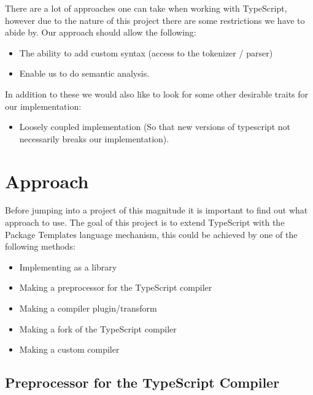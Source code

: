 There are a lot of approaches one can take when working with TypeScript, however due to the nature of this project there are some restrictions we have to abide by.
Our approach should allow the following:

\begin{itemize}
    \item The ability to add custom syntax (access to the tokenizer / parser)
    \item Enable us to do semantic analysis.
\end{itemize}

In addition to these we would also like to look for some other desirable traits for our implementation:

\begin{itemize}
    \item Loosely coupled implementation (So that new versions of typescript not necessarily breaks our implementation).
\end{itemize}


\section{Approach}\label{sec:choosing-the-right-approach}

Before jumping into a project of this magnitude it is important to find out what approach to use. 
The goal of this project is to extend TypeScript with the Package Templates language mechanism, this could be achieved by one of the following methods:

\begin{itemize}
    \item Implementing as a library
    \item Making a preprocessor for the TypeScript compiler
    \item Making a compiler plugin/transform
    \item Making a fork of the TypeScript compiler
    \item Making a custom compiler
\end{itemize}



\subsection{Preprocessor for the TypeScript Compiler}\label{subsec:preprocessor-for-the-typescript-compiler}

